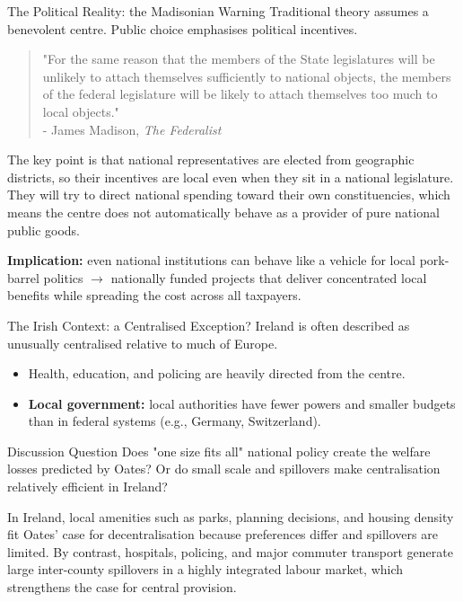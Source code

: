 \documentclass[10pt]{beamer}
\begin{document}
\begin{frame}{The Political Reality: the Madisonian Warning}
Traditional theory assumes a benevolent centre. Public choice emphasises political incentives.

\begin{quote}\small
"For the same reason that the members of the State legislatures will be unlikely to attach themselves sufficiently to national objects, the members of the federal legislature will be likely to attach themselves too much to local objects."\\
- James Madison, \textit{The Federalist}
\end{quote}

The key point is that national representatives are elected from geographic districts, so their incentives are local even when they sit in a national legislature. They will try to direct national spending toward their own constituencies, which means the centre does not automatically behave as a provider of pure national public goods.

\textbf{Implication:} even national institutions can behave like a vehicle for local pork-barrel politics $\rightarrow$ nationally funded projects that deliver concentrated local benefits while spreading the cost across all taxpayers.

\end{frame}

\begin{frame}{The Irish Context: a Centralised Exception?}
Ireland is often described as unusually centralised relative to much of Europe.

\begin{itemize}
\item Health, education, and policing are heavily directed from the centre.
\item \textbf{Local government:} local authorities have fewer powers and smaller budgets than in federal systems (e.g., Germany, Switzerland).
\end{itemize}

\vspace{0.15cm}
\begin{alertblock}{Discussion Question}
Does "one size fits all" national policy create the welfare losses predicted by Oates? Or do small scale and spillovers make centralisation relatively efficient in Ireland?
\end{alertblock}

\vspace{0.15cm}
\footnotesize
In Ireland, local amenities such as parks, planning decisions, and housing density fit Oates’ case for decentralisation because preferences differ and spillovers are limited.
By contrast, hospitals, policing, and major commuter transport generate large inter-county spillovers in a highly integrated labour market, which strengthens the case for central provision.

\end{frame}
\end{document}
